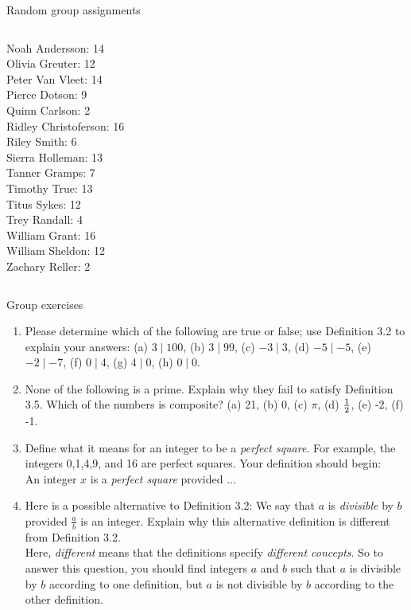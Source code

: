 \documentclass[10pt]{beamer}
\begin{document}
\begin{frame}{Random group assignments}
\begin{columns}
\begin{column}{0.33\textwidth}
Noah Andersson: 14 \\ 
Olivia Greuter: 12 \\ 
Peter Van Vleet: 14 \\ 
Pierce Dotson: 9 \\ 
Quinn Carlson: 2 \\ 
Ridley Christoferson: 16 \\ 
Riley Smith: 6 \\ 
Sierra Holleman: 13 \\ 
Tanner Gramps: 7 \\ 
Timothy True: 13 \\ 
Titus Sykes: 12 \\ 
Trey Randall: 4 \\ 
William Grant: 16 \\ 
William Sheldon: 12 \\ 
Zachary Reller: 2 \\
\end{column}
\end{columns}
\vfill
\end{frame}

\begin{frame}{Group exercises}
\begin{enumerate}
\item  Please determine which of the following are true or false; use Definition 3.2 to explain your answers: (a) $3 \mid 100$, (b) $3 \mid 99$, (c) $-3 \mid 3$, (d) $-5 \mid -5$, (e) $-2 \mid -7$, (f) $0 \mid 4$, (g) $4 \mid 0$, (h) $0 \mid 0$.
\item None of the following is a prime.  Explain why they fail to satisfy Definition 3.5.  Which of the numbers is composite? (a) 21, (b) 0, (c) $\pi$, (d) $\frac{1}{2}$, (e) -2, (f) -1.  
\item Define what it means for an integer to be a \textit{perfect square}.  For example, the integers 0,1,4,9, and 16 are perfect squares.  Your definition should begin: \\
\hspace{0.5cm} An integer $x$ is a \textit{perfect square} provided ...
\item Here is a possible alternative to Definition 3.2: We say that $a$ is \textit{divisible} by $b$ provided $\frac{a}{b}$ is an integer.  Explain why this alternative definition is different from Definition 3.2.  \\
\hspace{0.5cm} Here, \textit{different} means that the definitions specify \textit{different concepts}.  So to answer this question, you should find integers $a$ and $b$ such that $a$ is divisible by $b$ according to one definition, but $a$ is not divisible by $b$ according to the other definition. 
\end{enumerate}


\end{frame}
\end{document}
